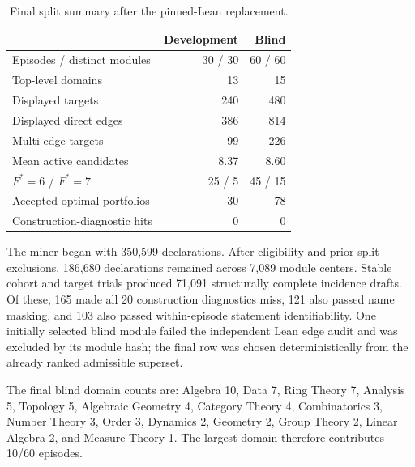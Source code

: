 \begin{table}[ht]
\centering
\caption{Final split summary after the pinned-Lean replacement.}
\small
\begin{tabular}{lrr}
\toprule
 & Development & Blind \\
\midrule
Episodes / distinct modules & 30 / 30 & 60 / 60 \\
Top-level domains & 13 & 15 \\
Displayed targets & 240 & 480 \\
Displayed direct edges & 386 & 814 \\
Multi-edge targets & 99 & 226 \\
Mean active candidates & 8.37 & 8.60 \\
$F^*=6$ / $F^*=7$ & 25 / 5 & 45 / 15 \\
Accepted optimal portfolios & 30 & 78 \\
Construction-diagnostic hits & 0 & 0 \\
\bottomrule
\end{tabular}
\end{table}

The miner began with 350,599 declarations. After eligibility and prior-split
exclusions, 186,680 declarations remained across 7,089 module centers. Stable
cohort and target trials produced 71,091 structurally complete incidence
drafts. Of these, 165 made all 20 construction diagnostics miss, 121 also
passed name masking, and 103 also passed within-episode statement
identifiability. One initially selected blind module failed the independent
Lean edge audit and was excluded by its module hash; the final row was chosen
deterministically from the already ranked admissible superset.

The final blind domain counts are: Algebra 10, Data 7, Ring Theory 7, Analysis
5, Topology 5, Algebraic Geometry 4, Category Theory 4, Combinatorics 3,
Number Theory 3, Order 3, Dynamics 2, Geometry 2, Group Theory 2, Linear
Algebra 2, and Measure Theory 1. The largest domain therefore contributes
10/60 episodes.
